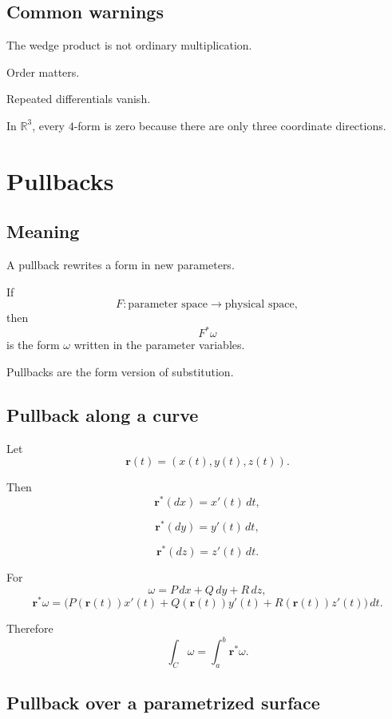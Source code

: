 \subsection*{Common warnings}

The wedge product is not ordinary multiplication.

Order matters.

Repeated differentials vanish.

In \(\mathbb R^3\), every \(4\)-form is zero because there are only three coordinate
directions.

\section{Pullbacks}
\label{app:E.3}

\subsection*{Meaning}

A pullback rewrites a form in new parameters.

If
\[
    F:\text{parameter space}\to\text{physical space},
\]
then
\[
\boxed{
    F^*\omega
}
\]
is the form \(\omega\) written in the parameter variables.

Pullbacks are the form version of substitution.

\subsection*{Pullback along a curve}

Let
\[
    \mathbf r(t)=(x(t),y(t),z(t)).
\]

Then
\[
\boxed{
    \mathbf r^*(dx)=x'(t)\,dt,
}
\]

\[
\boxed{
    \mathbf r^*(dy)=y'(t)\,dt,
}
\]

\[
\boxed{
    \mathbf r^*(dz)=z'(t)\,dt.
}
\]

For
\[
    \omega=P\,dx+Q\,dy+R\,dz,
\]
\[
\boxed{
    \mathbf r^*\omega
    =
    \bigl(P(\mathbf r(t))x'(t)
    +
    Q(\mathbf r(t))y'(t)
    +
    R(\mathbf r(t))z'(t)\bigr)\,dt.
}
\]

Therefore
\[
\boxed{
    \int_C \omega
    =
    \int_a^b \mathbf r^*\omega.
}
\]

\subsection*{Pullback over a parametrized surface}

